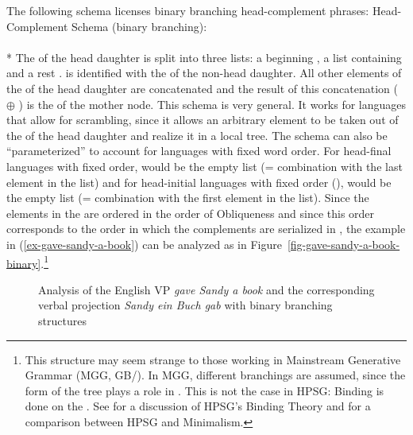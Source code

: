 \documentclass[output=paper,biblatex,babelshorthands,newtxmath,draftmode,colorlinks,citecolor=brown]{langscibook}
\begin{document}
The following schema licenses binary branching head-complement phrases:
\ea
Head-Complement Schema (binary branching):\\
\label{hcs-binary}\label{order-hcs-binary}
 \impl\\*
\z
\largerpage
The \compsl of the head daughter is split into three lists: a beginning , a list containing  and a rest
.  is identified with the \synsemv of the non-head daughter. All other elements of
the \compsl of the head daughter are concatenated and the result of this concatenation (
$\oplus$ ) is the \compsl of the mother node. This schema is very general. It works for
languages that allow for scrambling, since it allows an arbitrary element to be taken out of the \compsl
of the head daughter and realize it in a local tree. The schema can also be ``parameterized'' to account
for languages with fixed word order. For head-final languages with fixed order,  would be the
empty list (= combination with the last element in the list) and for head-initial languages with
fixed order (\eg {}),  would be the empty list (= combination with the first element in
the list). Since the elements in the \compsl are ordered in the order of Obliqueness \citep{KC77a,Pullum77a} and since this
order corresponds to the order in which the complements are serialized in , the example in (\ref{ex-gave-sandy-a-book}) can be
analyzed as in Figure~\ref{fig-gave-sandy-a-book-binary}.\footnote{
  This structure may seem strange to those working in Mainstream Generative Grammar (MGG,
  GB/). In MGG, different branchings are assumed, since the form of the tree plays a role in
  . This is not the case in HPSG: Binding is done on the \argstl. See
   for a discussion of HPSG's Binding Theory and
   for a comparison between HPSG and Minimalism.%
}
\begin{figure}
\hfill
{}
\caption{\label{fig-gave-sandy-a-book-binary}\label{fig-sandy-ein-buch-gab}Analysis of the English VP \emph{gave Sandy a book} and
  the corresponding  verbal projection \emph{Sandy ein Buch gab} with binary branching structures}
\end{figure}
\end{document}
